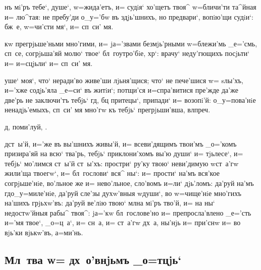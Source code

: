 \documentclass[12pt,a6paper,twoside,dvips,civil=antiqua,cs=izhitsa]{hipbook}
\begin{document}
нъ мi'ръ тебе`, душе`, w=жида'етъ, и= судiя` хо'щетъ твоя^ w=бличи'ти
та^йная и= лю^тая: не пребу'ди о_у='бw въ здjь'шнихъ, но предвари`, вопiю'щи
судiи`: бж~е, w=чи'сти мя`, и= сп~си' мя.

 кw прегрjьше'ньми мно'гими, и= jа='звами
безмjь'рными w=блежи'мь _е='смь, сп~се, согрjьша'яй молю` твое` бл~гоутро'бiе,
хр`: врачу` неду'гющихъ посjьти` и= и=сцjьли` и= сп~си' мя.

 уше` моя`, что` неради'во живе'ши
лjьня'щися; что` не пече'шися w= sлы'хъ, и='хже содjь'яла _е=си` въ житiи`;
потщи'ся и=спра'витися пре'жде да'же две'рь не заключи'тъ тебjь` гд, бц
притецы`, припади` и= возопi'й: о_у=пова'нiе ненадjь'емыхъ, сп~си' мя мно'гw
къ тебjь` прегрjьши'вша, вл преч.

\baselineskip
{}д, поми'луй, . 
\baselineskip

д ст~ы'й, и='же въ вы'шнихъ живы'й, и= всеви'дящимъ
твои'мъ _о='комъ призира'яй на всю` тва'рь, тебjь` приклони'хомъ вы'ю
души` и= тjьлесе`, и= тебjь` мо'лимся ст~ы'й ст~ы'хъ: простри` ру'ку
твою` неви'димую w\т ст~а'гw жили'ща твоегw`, и= бл~гослови` вся^
ны`: и= прости` на'мъ вся'кое согрjьше'нiе, во'льное же и= нево'льное,
сло'вомъ и=ли` дjь'ломъ: да'руй на'мъ гд о_у=миле'нiе, да'руй сле'зы
духw'вныя w\т души`, во w=чище'нiе мно'гихъ на'шихъ грjьхw'въ: да'руй ве'лiю
твою` мл на мi'ръ тво'й, и= на ны` недостw'йныя рабы^ твоя^: jа='кw
бл~гослове'но и= препросла'влено _е='сть и='мя твое`, _о=ц~а`, и= сн~а, и=
ст~а'гw дх~а, ны'нjь и= при'снw и= во вjь'ки вjькw'въ, а=ми'нь.

\csendpict

\clearpage
\hdrcrosspage
\subsection{Мл~тва w= дх~о'внjьмъ _о=тцjь`}
\end{document}
